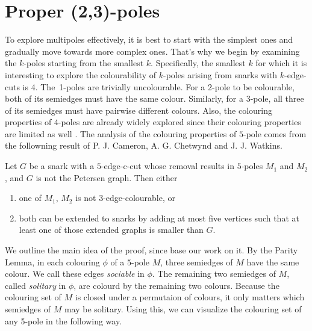 \section{Proper (2,3)-poles}\label{ch:proper-23-poles}



To explore multipoles effectively, it is best to start with the simplest ones and gradually move towards more complex ones. That's why we begin by examining the $k$-poles starting from the smallest $k$. Specifically, the smallest $k$ for which it is interesting to explore the colourability of $k$-poles arising from snarks with $k$-edge-cuts is 4.
The~1-poles are trivially uncolourable.
For a 2-pole to be colourable, both of its semiedges must have the same colour.
Similarly, for a 3-pole, all three of its semiedges must have pairwise different colours. Also, the colouring properties of $4$-poles are already widely explored since their colouring properties are limited as well \cite{ChladnyFactorisation}.
The analysis of the colouring properties of $5$-pole comes from the followning result of P. J. Cameron, A. G. Chetwynd and J. J. Watkins.

\begin{theorem}
	Let $G$ be a snark with a $5$-edge-c-cut whose removal results in $5$-poles $M_1$ and $M_2$, and $G$ is not the Petersen graph. Then either
	\begin{enumerate}[nolistsep]
		\item one of $M_1$, $M_2$ is not 3-edge-colourable, or
		\item both can be extended to snarks by adding at most five vertices such that at least one of those extended graphs is smaller than $G$.
	\end{enumerate}
\end{theorem}

We outline the main idea of the proof, since base our work on it. By the Parity Lemma, in each colouring $\phi$ of a $5$-pole $M$, three semiedges of $M$ have the same colour. We call these edges \textit{sociable} in $\phi$. The remaining two semiedges of $M$, called \emph{solitary} in $\phi$, are colourd by the remaining two colours.
Because the colouring set of $M$ is closed under a permutaion of colours, it only matters which semiedges of $M$ may be solitary. Using this, we can visualize the colouring set of any 5-pole in the following way.

